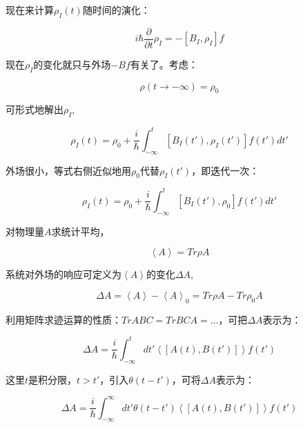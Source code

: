 现在来计算$\rho_I (t)$随时间的演化：

\begin{equation}
i \hbar \frac{\partial}{\partial t} \rho_I = - [B_I , \rho_I ] f
\end{equation}

现在$\rho_I$的变化就只与外场$- Bf$有关了。考虑：

\begin{equation}
\rho(t \to - \infty) = \rho_0
\end{equation}

可形式地解出$\rho_I$,

\begin{equation}
\rho_I(t) = \rho_0  + \frac{i}{\hbar} \int_{-\infty}^{t} [B_I(t'), \rho_I(t')] f(t') dt'
\end{equation}

外场很小，等式右侧近似地用$\rho_0$代替$\rho_I(t')$，即迭代一次：

\begin{equation}
\rho_I(t) = \rho_0  + \frac{i}{\hbar} \int_{-\infty}^{t} [B_I(t'), \rho_0] f(t') dt'
\end{equation}

对物理量$A$求统计平均，

\begin{equation}
\left\langle A \right\rangle = Tr \rho A
\end{equation}

系统对外场的响应可定义为$\left\langle A\right\rangle$的变化$\Delta A$,

\begin{equation}
\Delta A = \left\langle A \right\rangle - \left\langle A \right\rangle_0 =  Tr \rho A - Tr \rho_0 A
\end{equation}

利用矩阵求迹运算的性质：$Tr ABC = Tr BCA = ...$，可把$\Delta A$表示为：

\begin{equation}
\Delta A = \frac{i}{\hbar} \int_{-\infty}^{t} dt' \left\langle [A(t) , B(t')] \right\rangle f(t')   
\end{equation}

这里$t$是积分限，$t > t'$，引入$\theta (t - t')$，可将$\Delta A$表示为：

\begin{equation}\label{Kubo Formula}
\Delta A = \frac{i}{\hbar} \int_{-\infty}^{\infty} dt' \theta(t - t') \left\langle [A(t) , B(t')] \right\rangle f(t')
\end{equation}

